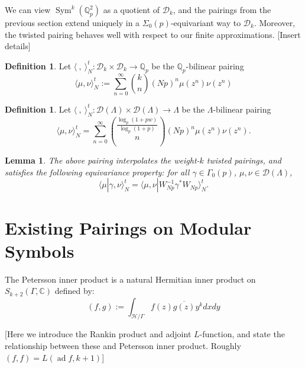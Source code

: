 \documentclass[10pt]{amsart}
\theoremstyle{plain}
\newtheorem{lemma}[theorem]{Lemma}
\theoremstyle{definition}
\newtheorem{definition}[theorem]{Definition}
\newcommand{\CC}{{\mathbb{C}}}
\newcommand{\QQ}{{\mathbb{Q}}}
\newcommand{\cH}{\mathcal{H}}
\newcommand{\cD}{\mathcal{D}}
\DeclareMathOperator{\Sym}{Sym}
\DeclareMathOperator{\ad}{ad}
\begin{document}
We can view $\Sym^k(\QQ_p^2)$ as a quotient of $\cD_k$, and the pairings from the previous section extend uniquely in a $\Sigma_0(p)$-equivariant way to $\cD_k$. Moreover, the twisted pairing behaves well with respect to our finite approximations. [Insert details]

\begin{definition}
Let $\langle~,~\rangle^t_N : \cD_k\times\cD_k\longrightarrow \QQ_p$ be the $\QQ_p$-bilinear pairing
\begin{equation}
	\langle \mu, \nu \rangle_N^t := \sum_{n=0}^\infty {k \choose n} (Np)^n \mu(z^n)\nu(z^n)
\end{equation}
\end{definition}




\begin{definition}
Let $\langle ~, ~\rangle^t_N :\cD(\Lambda)\times\cD(\Lambda) \longrightarrow \Lambda$ be the $\Lambda$-bilinear pairing
\begin{equation}
	\langle \mu, \nu \rangle_N^t = \sum_{n=0}^\infty {\frac{\log_p(1+pw)}{\log_p(1+p)} \choose n} (Np)^n \mu(z^n)\nu(z^n).
\end{equation}
\end{definition}

\begin{lemma}
The above pairing interpolates the weight-$k$ twisted pairings, and satisfies the following equivariance property: for all $\gamma \in\Gamma_0(p)$, $\mu,\nu\in \cD(\Lambda)$, 
\begin{equation}
	\langle \mu | \gamma, \nu\rangle_N^t  = \langle \mu, \nu| W_{Np}^{-1}\gamma^* W_{Np}\rangle_N^t.
\end{equation}	
\end{lemma}


\section{Existing Pairings on Modular Symbols} \label{sec:existing_pairings}
The Petersson inner product is a natural Hermitian inner product on $S_{k+2}(\Gamma,\CC)$ defined by:
\begin{equation*}
	(f,g) := \int_{\cH/\Gamma} f(z) \overline{g(z)} y^{k} dx dy
\end{equation*}

[Here we introduce the Rankin product and adjoint $L$-function, and state the relationship between these and Petersson inner product. Roughly $(f,f)=L(\ad f,k+1)$]
\end{document}
